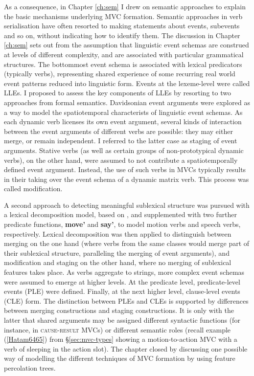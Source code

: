 As a consequence, in Chapter \ref{ch:sem} I drew on semantic approaches to explain the basic mechanisms underlying MVC formation. Semantic approaches in verb serialisation have often resorted to making statements about events, subevents and so on, without indicating how to identify them. The discussion in Chapter \ref{ch:sem} sets out from the assumption that linguistic event schemas are construed at levels of different complexity, and are associated with particular grammatical structures. The bottommost event schema is associated with lexical predicators (typically verbs), representing shared experience of some recurring real world event patterns reduced into linguistic form. Events at the lexeme-level were called LLEs. I proposed to assess the key components of LLEs by resorting to two approaches from formal semantics. Davidsonian event arguments were explored as a way to model the spatiotemporal characterists of linguistic event schemas. As each dynamic verb licenses its own event argument, several kinds of interaction between the event arguments of different verbs are possible: they may either merge, or remain independent. I referred to the latter case as staging of event arguments. Stative verbs (as well as certain groups of non-prototypical dynamic verbs), on the other hand, were assumed to not contribute a spatiotemporally defined event argument. Instead, the use of such verbs in MVCs typically results in their taking over the event schema of a dynamic matrix verb. This process was called modification.

A second approach to detecting meaningful sublexical structure was pursued with a lexical decomposition model, based on \citet{van1997syntax}, and supplemented with two further predicate functions, \textbf{move'} and \textbf{say'}, to model motion verbs and speech verbs, respectively. Lexical decomposition was then applied to distinguish between merging on the one hand (where verbs from the same classes would merge part of their sublexical structure, paralleling the merging of event arguments), and modification and staging on the other hand, where no merging of sublexical features takes place. As verbs aggregate to strings, more complex event schemas were assumed to emerge at higher levels. At the predicate level, predicate-level events (PLE) were defined. Finally, at the next higher level, clause-level events (CLE) form. The distinction between PLEs and CLEs is supported by differences between merging constructions and staging constructions. It is only with the latter that shared arguments may be assigned different syntactic functions (for instance, in \textsc{cause-result} MVCs) or different semantic roles (recall example (\ref{Hatam6465}) from §\ref{sec:mvc-types} showing a motion-to-action MVC with a verb of sleeping in the action slot). The chapter closed by discussing one possible way of modelling the different techniques of MVC formation by using feature percolation trees.

